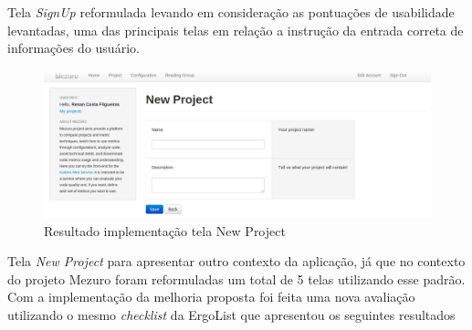 Tela \textit{SignUp} reformulada levando em consideração as pontuações de usabilidade levantadas, uma das principais telas em relação a instrução da entrada correta de informações do usuário.

\graphicspath{{figuras/}}
\begin{figure}[h]
\centering
\includegraphics[width=1.0\textwidth]{TelaNewProject}
\caption{Resultado implementação tela New Project}
\label{parallel-coordinate}
\end{figure}

Tela \textit{New Project} para apresentar outro contexto da aplicação, já que no contexto do projeto Mezuro foram reformuladas um total de 5 telas utilizando esse padrão. Com a implementação da melhoria proposta foi feita uma nova avaliação utilizando o mesmo \textit{checklist} da ErgoList que apresentou os seguintes resultados

